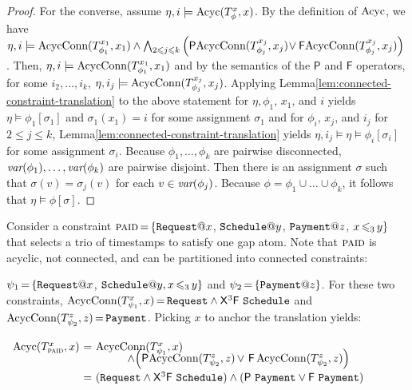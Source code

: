 \begin{proof}
  For the converse,
  assume $\eta, i \models \text{Acyc}(T_\phi^{x},x)$.
  By the definition of $\text{Acyc}$, we have $\eta, i \models \text{AcycConn}(T_{\phi_1}^{x_1},x_1) \land
    \bigwedge_{2\leqslant j \leqslant k}
    \left(\textsf{P}\text{AcycConn}(T_{\phi_j}^{x_j},x_j)\!\lor
  \textsf{F}\text{AcycConn}(T_{\phi_j}^{x_j},x_j)\right)$.
  Then, $\eta, i\models \text{AcycConn}(T_{\phi_1}^{x_1},x_1)$
  and by the semantics of the $\textsf{P}$ and $\textsf{F}$ operators,
  for some $i_2,...,i_k$, $\eta, i_j\models \text{AcycConn}(T_{\phi_j}^{x_j},x_j)$.
  Applying Lemma\:\ref{lem:connected-constraint-translation}
  to the above statement for $\eta, \phi_1$, $x_1$, and $i$ yields $\eta \models \phi_1[\sigma_1]$
  and $\sigma_1(x_1)=i$
  for some assignment $\sigma_1$
  and for $\phi_i$, $x_j$, and $i_j$ for $2 \leq j \leq k$,
  Lemma\:\ref{lem:connected-constraint-translation} yields
  $\eta, i_j \models \eta \models \phi_i[\sigma_i]$
  for some assignment $\sigma_i$.
  Because $\phi_1,\dots,\phi_k$ are pairwise disconnected,
  $\textit{var}(\phi_1),\dots,\textit{var}(\phi_k)$ are pairwise disjoint.
  Then there is an assignment $\sigma$
  such that $\sigma(v)=\sigma_j(v)$ for each $v\in\textit{var}(\phi_j)$.
  Because $\phi=\phi_1\cup\dots\cup\phi_k$,
  it follows that $\eta \models \phi[\sigma]$.
\end{proof}

\begin{examp}\label{ex:disconnected-cons}
  Consider a constraint $\textsc{paid}\tight=\{\Request@x$,
  $\Schedule@y$, $\Payment@z$,
  $x\,{\leqslant_3}\,y\}$ 
  that selects a trio of timestamps
  to satisfy one gap atom.
    Note that $\textsc{paid}$ is acyclic, not connected,
    and can be partitioned into connected constraints:

    $\psi_{1}\tight=\{\Request@x$,
    $\Schedule@y,x\tight{\leq_3}y\}$
    and 
    $\psi_{2}\tight=\{\Payment@z\}$.
    For these two constraints,
    $\text{AcycConn}(T_{\psi_{1}}^{x},x)\,{=}\,\texttt{Request}
    \land{\sf X}^3{\sf F}\ \texttt{Schedule}$
    and
    $\text{AcycConn}(T_{\psi_{2}}^{z},z)\,{=}\,\texttt{Payment}$.
    Picking $x$ to anchor
    the translation yields: 
     
    $
    \def\arraystretch{1.25}
    \begin{array}{r@{~}c@{~}l}
     \Acyc(T_{\textsc{paid}}^x,x)&=&\AcycConn(T_{\psi_{1}}^{x},x)
                                     \\*[-2mm]
      &&\hspace*{1cm}\land \Big({\sf P}\AcycConn(T_{\psi_{2}}^{z},z)
     \tight{\lor}\tight
     {\sf F}\AcycConn(T_{\psi_{2}}^{z},z)\Big)
      \\
      &=&
      (\Request
    \land{\sf X}^3{\sf F}\ \Schedule)
    \land({\sf P}\ \Payment \lor {\sf F}\ \Payment)
    \end{array}
    $
  \end{examp}
  
